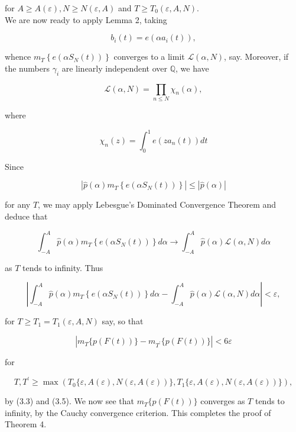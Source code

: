 \documentclass[10pt]{article}
\begin{document}
for $A \geq A(\varepsilon), N \geq N(\varepsilon, A)$ and $T \geq T_{0}(\varepsilon, A, N)$.\\
We are now ready to apply Lemma 2, taking

$$
b_{i}(t)=e\left(\alpha a_{i}(t)\right),
$$

whence $m_{T}\left\{e\left(\alpha S_{N}(t)\right)\right\}$ converges to a limit $\mathcal{L}(\alpha, N)$, say. Moreover, if the numbers $\gamma_{i}$ are linearly independent over $\mathbb{Q}$, we have

$$
\mathcal{L}(\alpha, N)=\prod_{n \leq N} \chi_{n}(\alpha),
$$

where


\begin{equation*}
\chi_{n}(z)=\int_{0}^{1} e\left(z a_{n}(t)\right) d t \tag{3.4}
\end{equation*}


Since

$$
\left|\widehat{p}(\alpha) m_{T}\left\{e\left(\alpha S_{N}(t)\right)\right\}\right| \leq|\widehat{p}(\alpha)|
$$

for any $T$, we may apply Lebesgue's Dominated Convergence Theorem and\\
deduce that

$$
\int_{-A}^{A} \widehat{p}(\alpha) m_{T}\left\{e\left(\alpha S_{N}(t)\right)\right\} d \alpha \rightarrow \int_{-A}^{A} \widehat{p}(\alpha) \mathcal{L}(\alpha, N) d \alpha
$$

as $T$ tends to infinity. Thus


\begin{equation*}
\left|\int_{-A}^{A} \widehat{p}(\alpha) m_{T}\left\{e\left(\alpha S_{N}(t)\right)\right\} d \alpha-\int_{-A}^{A} \widehat{p}(\alpha) \mathcal{L}(\alpha, N) d \alpha\right|<\varepsilon, \tag{3.5}
\end{equation*}


for $T \geq T_{1}=T_{1}(\varepsilon, A, N)$ say, so that

$$
\left|m_{T}\{p(F(t))\}-m_{T^{\prime}}\{p(F(t))\}\right|<6 \varepsilon
$$

for

$$
T, T^{\prime} \geq \max \left(T_{0}\{\varepsilon, A(\varepsilon), N(\varepsilon, A(\varepsilon))\}, T_{1}\{\varepsilon, A(\varepsilon), N(\varepsilon, A(\varepsilon))\}\right),
$$

by (3.3) and (3.5). We now see that $m_{T}\{p(F(t))\}$ converges as $T$ tends to infinity, by the Cauchy convergence criterion. This completes the proof of Theorem 4.
\end{document}
